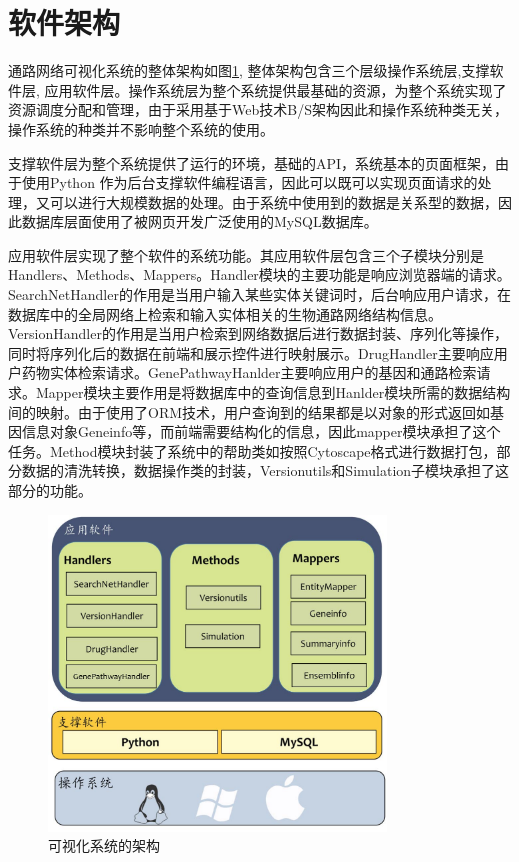 \section{软件架构}
通路网络可视化系统的整体架构如图\ref{fig31}, 整体架构包含三个层级操作系统层,支撑软件层, 应用软件层。操作系统层为整个系统提供最基础的资源，为整个系统实现了资源调度分配和管理，由于采用基于Web技术B/S架构因此和操作系统种类无关，操作系统的种类并不影响整个系统的使用。

支撑软件层为整个系统提供了运行的环境，基础的API，系统基本的页面框架，由于使用Python 作为后台支撑软件编程语言，因此可以既可以实现页面请求的处理，又可以进行大规模数据的处理。由于系统中使用到的数据是关系型的数据，因此数据库层面使用了被网页开发广泛使用的MySQL数据库。

应用软件层实现了整个软件的系统功能。其应用软件层包含三个子模块分别是Handlers、Methods、Mappers。Handler模块的主要功能是响应浏览器端的请求。SearchNetHandler的作用是当用户输入某些实体关键词时，后台响应用户请求，在数据库中的全局网络上检索和输入实体相关的生物通路网络结构信息。VersionHandler的作用是当用户检索到网络数据后进行数据封装、序列化等操作，同时将序列化后的数据在前端和展示控件进行映射展示。DrugHandler主要响应用户药物实体检索请求。GenePathwayHanlder主要响应用户的基因和通路检索请求。Mapper模块主要作用是将数据库中的查询信息到Hanlder模块所需的数据结构间的映射。由于使用了ORM技术，用户查询到的结果都是以对象的形式返回如基因信息对象Geneinfo等，而前端需要结构化的信息，因此mapper模块承担了这个任务。Method模块封装了系统中的帮助类如按照Cytoscape格式进行数据打包，部分数据的清洗转换，数据操作类的封装，Versionutils和Simulation子模块承担了这部分的功能。
\begin{figure}[h]
\centering
\includegraphics[width = 0.8\textwidth]{framework}
\caption[fig31]{可视化系统的架构}
\label{fig31}
\end{figure}

